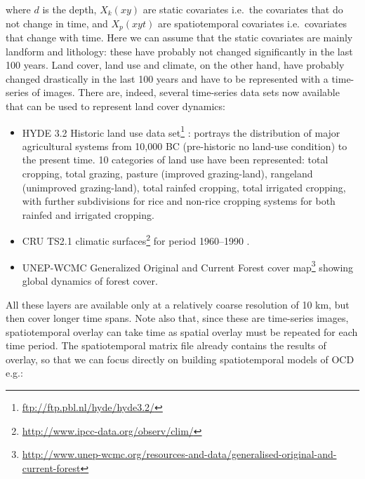 \documentclass[graybox,natbib,nospthms,UStrade]{svmono}
\renewcommand{\href}[2]{#2 (\url{#1})}
\renewcommand{\href}[2]{#2\footnote{\url{#1}}}
\begin{document}
where \(d\) is the depth, \(X_k (xy)\) are static covariates i.e.~the covariates that do not change in time, and \(X_p (xyt)\) are spatiotemporal covariates i.e.~covariates that change with time. Here we can assume that the static covariates are mainly landform and lithology: these have probably not changed significantly in the last 100 years. Land cover, land use and climate, on the other hand, have probably changed drastically in the last 100 years and have to be represented with a time-series of images. There are, indeed, several time-series data sets now available that can be used to represent land cover dynamics:

\begin{itemize}
\item
  \href{ftp://ftp.pbl.nl/hyde/hyde3.2/}{HYDE 3.2 Historic land use data set} \citep{klein2011hyde}: portrays the distribution of major agricultural systems from 10,000 BC (pre-historic no land-use condition) to the present time. 10 categories of land use have been represented: total cropping, total grazing, pasture (improved grazing-land), rangeland (unimproved grazing-land), total rainfed cropping, total irrigated cropping, with further subdivisions for rice and non-rice cropping systems for both rainfed and irrigated cropping.
\item
  \href{http://www.ipcc-data.org/observ/clim/}{CRU TS2.1 climatic surfaces} for period 1960--1990 \citep{harris2014updated}.
\item
  \href{http://www.unep-wcmc.org/resources-and-data/generalised-original-and-current-forest}{UNEP-WCMC Generalized Original and Current Forest cover map} showing global dynamics of forest cover.
\end{itemize}

All these layers are available only at a relatively coarse resolution of 10 km, but then cover longer time spans. Note also that, since these are time-series images, spatiotemporal overlay can take time as spatial overlay must be repeated for each time period. The spatiotemporal matrix file already contains the results of overlay, so that we can focus directly on building spatiotemporal models of OCD e.g.:
\end{document}

